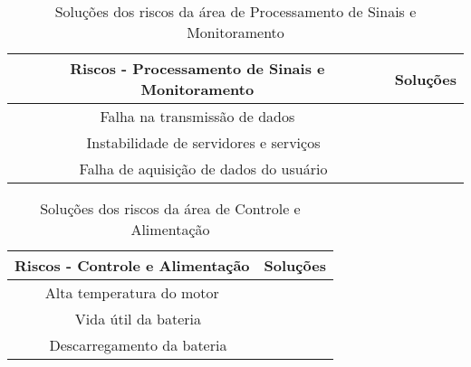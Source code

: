 \begin{table}[h]
\centering
\vspace{0.5cm}
\begin{tabular}{|c|c|}
\hline
Riscos - Processamento de Sinais e Monitoramento         & Soluções \\
\hline
Falha na transmissão de dados             & \\ 
Instabilidade de servidores e serviços    & \\ 
Falha de aquisição de dados do usuário    & \\
\hline
\end{tabular}
\caption{Soluções dos riscos da área de Processamento de Sinais e Monitoramento}
\label{tab:riscosubareacont}
\end{table}

\begin{table}[h]
\centering
\vspace{0.5cm}
\begin{tabular}{|c|c|}
\hline
Riscos - Controle e Alimentação & Soluções \\
\hline
Alta temperatura do motor     & \\ 
Vida útil da bateria          & \\ 
Descarregamento da bateria    & \\
\hline
\end{tabular}
\caption{Soluções dos riscos da área de Controle e Alimentação}
\label{tab:riscosubareaalim}
\end{table}
